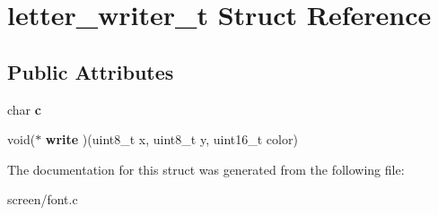\hypertarget{structletter__writer__t}{}\section{letter\+\_\+writer\+\_\+t Struct Reference}
\label{structletter__writer__t}
\subsection*{Public Attributes}
\begin{DoxyCompactItemize}
\item 
char {\bfseries c}\hypertarget{structletter__writer__t_a5e8d31dc58c3cc8c51a731ed326f9cb7}{}\label{structletter__writer__t_a5e8d31dc58c3cc8c51a731ed326f9cb7}

\item 
void($\ast$ {\bfseries write} )(uint8\+\_\+t x, uint8\+\_\+t y, uint16\+\_\+t color)\hypertarget{structletter__writer__t_a174eb2be482048a33f84e731b6d21d65}{}\label{structletter__writer__t_a174eb2be482048a33f84e731b6d21d65}

\end{DoxyCompactItemize}


The documentation for this struct was generated from the following file\+:\begin{DoxyCompactItemize}
\item 
screen/font.\+c\end{DoxyCompactItemize}
